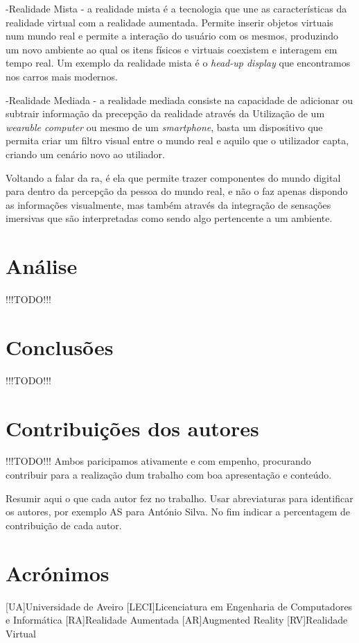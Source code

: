 \documentclass{report}
\begin{document}
-Realidade Mista - a realidade mista é a tecnologia que une as características da realidade virtual com a realidade aumentada. Permite inserir objetos virtuais num mundo real e permite a interação do usuário com os mesmos, produzindo um novo ambiente ao qual os itens físicos e virtuais coexistem e interagem em tempo real. Um exemplo da realidade mista é o \textit{head-up display} que encontramos nos carros mais modernos.

-Realidade Mediada - a realidade mediada consiste na capacidade de adicionar ou subtrair informação da precepção da realidade através da Utilização de um \textit{wearable computer} ou mesmo de um \textit{smartphone}, basta um dispositivo que permita criar um filtro visual entre o mundo real e aquilo que o utilizador capta, criando um cenário novo ao utiliador.

Voltando a falar da \ac{ra}, é ela que permite trazer componentes do mundo digital para dentro da percepção da pessoa do mundo real, e não o faz apenas dispondo as informações visualmente, mas também através da integração de sensações imersivas que são interpretadas como sendo algo pertencente a um ambiente.

\chapter{Análise}
\label{chap.analise}
!!!TODO!!!

\chapter{Conclusões}
\label{chap.conclusao}
!!!TODO!!!

\chapter*{Contribuições dos autores}
!!!TODO!!! 
Ambos paricipamos ativamente e com empenho, procurando contribuir para a realização dum trabalho com boa apresentação e conteúdo.

Resumir aqui o que cada autor fez no trabalho. Usar abreviaturas para identificar os autores, por exemplo AS para António Silva. No fim indicar a percentagem de contribuição de cada autor.

\chapter*{Acrónimos}
\begin{acronym}
[UA]{Universidade de Aveiro}
[LECI]{Licenciatura em Engenharia de Computadores e Informática}
[RA]{Realidade Aumentada}
[AR]{Augmented Reality}
[RV]{Realidade Virtual}
\end{acronym}

\printbibliography
\end{document}
